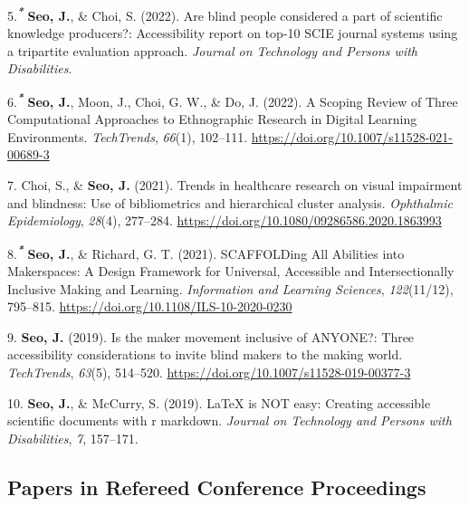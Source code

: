 \documentclass[11pt,a4paper,]{awesome-cv}
\begin{document}
\leavevmode{}%
5.\textsuperscript{\textbf{\emph{*}}} \textbf{Seo, J.}, \& Choi, S.
(2022). Are blind people considered a part of scientific knowledge
producers?: Accessibility report on top-10 SCIE journal systems using a
tripartite evaluation approach. \emph{Journal on Technology and Persons
with Disabilities}.

\leavevmode{}%
6.\textsuperscript{\textbf{\emph{*}}} \textbf{Seo, J.}, Moon, J., Choi,
G. W., \& Do, J. (2022). A Scoping Review of Three Computational
Approaches to Ethnographic Research in Digital Learning Environments.
\emph{TechTrends}, \emph{66}(1), 102--111.
\url{https://doi.org/10.1007/s11528-021-00689-3}

\leavevmode{}%
7. Choi, S., \& \textbf{Seo, J.} (2021). Trends in healthcare research
on visual impairment and blindness: Use of bibliometrics and
hierarchical cluster analysis. \emph{Ophthalmic Epidemiology},
\emph{28}(4), 277--284.
\url{https://doi.org/10.1080/09286586.2020.1863993}

\leavevmode{}%
8.\textsuperscript{\textbf{\emph{*}}} \textbf{Seo, J.}, \& Richard, G.
T. (2021). SCAFFOLDing All Abilities into Makerspaces: A Design
Framework for Universal, Accessible and Intersectionally Inclusive
Making and Learning. \emph{Information and Learning Sciences},
\emph{122}(11/12), 795--815.
\url{https://doi.org/10.1108/ILS-10-2020-0230}

\leavevmode{}%
9. \textbf{Seo, J.} (2019). Is the maker movement inclusive of ANYONE?:
Three accessibility considerations to invite blind makers to the making
world. \emph{TechTrends}, \emph{63}(5), 514--520.
\url{https://doi.org/10.1007/s11528-019-00377-3}

\leavevmode{}%
10. \textbf{Seo, J.}, \& McCurry, S. (2019). LaTeX is NOT easy: Creating
accessible scientific documents with r markdown. \emph{Journal on
Technology and Persons with Disabilities}, \emph{7}, 157--171.

\hypertarget{papers-in-refereed-conference-proceedings}{%
\subsection{Papers in Refereed Conference
Proceedings}\label{papers-in-refereed-conference-proceedings}}
\end{document}
